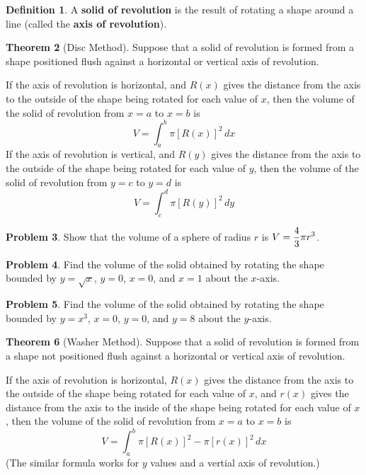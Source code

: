 \documentclass[letterpaper, twoside, 12pt]{book}
\theoremstyle{definition}
\newtheorem{theorem}{Theorem}
\theoremstyle{definition}
\newtheorem{definition}[theorem]{Definition}
\newtheorem{problem}[theorem]{Problem}
\newcommand{\ds}{\ensuremath{\displaystyle}}
\begin{document}
\vfill

\newpage

\begin{definition}
  A \textbf{solid of revolution} is the result of rotating a shape around
  a line (called the \textbf{axis of revolution}).
\end{definition}

\begin{theorem}[Disc Method]
  Suppose that a solid of revolution is formed from a shape positioned flush
  against a horizontal or vertical axis of revolution.

  If the axis of revolution is horizontal, and $R(x)$ gives the distance from the
  axis to the outside of the shape being rotated for each value of $x$,
  then the volume of the solid of revolution from $x=a$ to $x=b$ is
  \[
    V = \int_a^b \pi [R(x)]^2\, dx
  \]
  If the axis of revolution is vertical, and $R(y)$ gives the distance from the
  axis to the outside of the shape being rotated for each value of $y$,
  then the volume of the solid of revolution from $y=c$ to $y=d$ is
  \[
    V = \int_c^d \pi [R(y)]^2\, dy
  \]
\end{theorem}

\begin{problem}
 Show that the volume of a sphere of radius $r$ is $\ds V = \frac{4}{3}\pi r^3$.
\end{problem}

\vfill

\newpage

\begin{problem}
 Find the volume of the solid obtained by rotating the shape bounded by
 $y=\sqrt{x}$, $y=0$, $x=0$, and $x=1$ about the $x$-axis.
\end{problem}

\vfill

\begin{problem}
 Find the volume of the solid obtained by rotating the shape bounded by
 $y = x^3$, $x=0$, $y = 0$, and $y=8$ about the $y$-axis.
\end{problem}

\vfill

\newpage

\begin{theorem}[Washer Method]
  Suppose that a solid of revolution is formed from a shape not positioned flush
  against a horizontal or vertical axis of revolution.

  If the axis of revolution is horizontal, $R(x)$ gives the distance from the
  axis to the outside of the shape being rotated for each value of $x$, and
  $r(x)$ gives the distance from the axis to the inside of the shape being
  rotated for each value of $x$,
  then the volume of the solid of revolution from $x=a$ to $x=b$ is
  \[
    V = \int_a^b \pi [R(x)]^2-\pi [r(x)]^2\, dx
  \]
  (The similar formula works for $y$ values and a vertial axis of revolution.)
\end{theorem}
\end{document}
